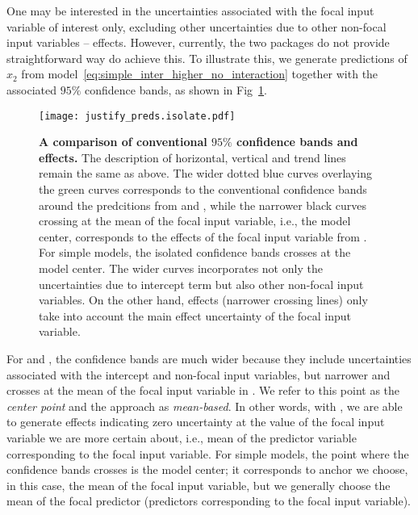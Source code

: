 One may be interested in the uncertainties associated with the focal input variable of interest only, excluding other uncertainties due to other non-focal input variables -- effects. However, currently, the two packages do not provide straightforward way do achieve this. To illustrate this, we generate predictions of $x_2$ from model~\ref{eq:simple_inter_higher_no_interaction} together with the associated $95\%$ confidence bands, as shown in Fig~\ref{fig:justify_ci_plots}. 

\begin{figure}
\begin{center}
\texttt{[image: justify\_preds.isolate.pdf]}
\end{center}
\caption{{\bf A comparison of conventional $95\%$ confidence bands and effects.} The description of horizontal, vertical and trend lines remain the same as above. The wider dotted blue curves overlaying the green curves corresponds to the conventional confidence bands around the predcitions from  and , while the narrower black curves crossing at the mean of the focal input variable, i.e., the model center, corresponds to the effects of the focal input variable from . For simple models, the isolated confidence bands crosses at the model center. The wider curves incorporates not only the uncertainties due to intercept term but also other non-focal input variables. On the other hand, effects (narrower crossing lines) only take into account the main effect uncertainty of the focal input variable.}
\label{fig:justify_ci_plots}
\end{figure}

For  and , the confidence bands are much wider because they include uncertainties associated with the intercept and non-focal input variables, but narrower and crosses at the mean of the focal input variable in . We refer to this point as the \emph{center point} and the approach as \emph{mean-based}. In other words, with , we are able to generate effects indicating zero uncertainty at the value of the focal input variable we are more certain about, i.e., mean of the predictor variable corresponding to the focal input variable. For simple models, the point where the confidence bands crosses is the model center; it corresponds to anchor we choose, in this case, the mean of the focal input variable, but we generally choose the mean of the focal predictor (predictors corresponding to the focal input variable).

